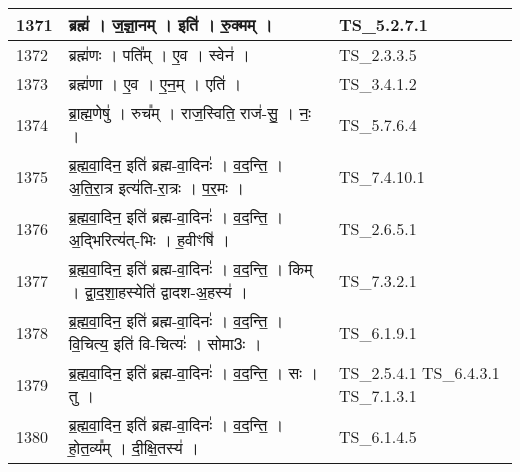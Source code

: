 \documentclass[17pt]{extarticle}
\begin{document}
\begin{longtable}{||p{0.4in}||p{4.9in}||p{0.9in}||}
    \hline
        
    1371 & ब्रह्म॑   ।   ज॒ज्ञा॒नम्   ।   इति॑   ।   रु॒क्मम्   ।    & TS\_5.2.7.1       \\
    
    \hline
        
    1372 & ब्रह्म॑णः   ।   पति᳚म्   ।   ए॒व   ।   स्वेन॑   ।    & TS\_2.3.3.5       \\
    
    \hline
        
    1373 & ब्रह्म॑णा   ।   ए॒व   ।   ए॒न॒म्   ।   एति॑   ।    & TS\_3.4.1.2       \\
    
    \hline
        
    1374 & ब्रा॒ह्म॒णेषु॑   ।   रुच᳚म्   ।   राज॒स्विति॒ राज॑{-}सु॒   ।   नः॒   ।    & TS\_5.7.6.4       \\
    
    \hline
        
    1375 & ब्र॒ह्म॒वा॒दिन॒ इति॑ ब्रह्म{-}वा॒दिनः॑   ।   व॒द॒न्ति॒   ।   अ॒ति॒रा॒त्र इत्य॑ति{-}रा॒त्रः   ।   प॒र॒मः   ।    & TS\_7.4.10.1       \\
    
    \hline
        
    1376 & ब्र॒ह्म॒वा॒दिन॒ इति॑ ब्रह्म{-}वा॒दिनः॑   ।   व॒द॒न्ति॒   ।   अ॒द्भिरित्य॑त्{-}भिः   ।   ह॒वीꣳषि॑   ।    & TS\_2.6.5.1       \\
    
    \hline
        
    1377 & ब्र॒ह्म॒वा॒दिन॒ इति॑ ब्रह्म{-}वा॒दिनः॑   ।   व॒द॒न्ति॒   ।   किम्   ।   द्वा॒द॒शा॒हस्येति॑ द्वादश{-}अ॒हस्य॑   ।    & TS\_7.3.2.1       \\
    
    \hline
        
    1378 & ब्र॒ह्म॒वा॒दिन॒ इति॑ ब्रह्म{-}वा॒दिनः॑   ।   व॒द॒न्ति॒   ।   वि॒चित्य॒ इति॑ वि{-}चित्यः॑   ।   सोमा3ः   ।    & TS\_6.1.9.1       \\
    
    \hline
        
    1379 & ब्र॒ह्म॒वा॒दिन॒ इति॑ ब्रह्म{-}वा॒दिनः॑   ।   व॒द॒न्ति॒   ।   सः   ।   तु   ।    & TS\_2.5.4.1 TS\_6.4.3.1 TS\_7.1.3.1       \\
    
    \hline
        
    1380 & ब्र॒ह्म॒वा॒दिन॒ इति॑ ब्रह्म{-}वा॒दिनः॑   ।   व॒द॒न्ति॒   ।   हो॒त॒व्य᳚म्   ।   दी॒क्षि॒तस्य॑   ।    & TS\_6.1.4.5       \\
    

\end{longtable}
\end{document}
